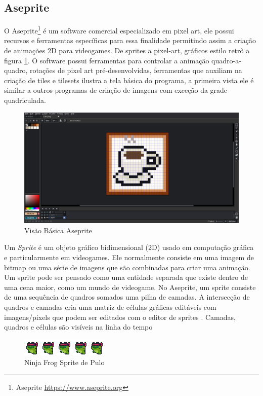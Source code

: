 \newpage
\subsection{Aseprite}  
\label{sec:aseprite}
O Aseprite\footnote{Aseprite \url{https://www.aseprite.org}} é um software comercial especializado em pixel art, ele possui recursos e ferramentas específicas para essa finalidade permitindo assim a criação de animações 2D para videogames. De sprites a pixel-art, gráficos estilo retrô a figura \ref{fig:aseprite}. O software possui ferramentas para controlar
a animação quadro-a-quadro, rotações de pixel art pré-desenvolvidas, ferramentas que auxiliam na criação de tiles e tilesets
ilustra a tela básica do programa, a primeira vista ele é similar a outros programas de criação de imagens com exceção da grade quadriculada.  
\begin{figure}[ht!]
    \centering
    \includegraphics[width=1\linewidth]{figuras/aseprite.jpg}
    \caption{Visão Básica Aseprite}
    \label{fig:aseprite}
\end{figure}

Um \textit{Sprite} é um objeto gráfico bidimensional (2D) usado em computação gráfica e particularmente em videogames. Ele normalmente consiste em uma imagem de bitmap ou uma série de imagens que são combinadas para criar uma animação. Um sprite pode ser pensado como uma entidade separada que existe dentro de uma cena maior, como um mundo de videogame. No Aseprite, um sprite consiste de uma sequência de quadros somados uma pilha de camadas. A intersecção de quadros e camadas cria uma matriz de células gráficas editáveis com imagens/pixels que podem ser editados com o editor de sprites . Camadas, quadros e células são visíveis na linha do tempo
\begin{figure}[h!]
    \centering
    \includegraphics[width=1\linewidth]{figuras/sprite-frog.png}
    \caption{Ninja Frog Sprite de Pulo}
    \label{fig:enter-label}
\end{figure}
